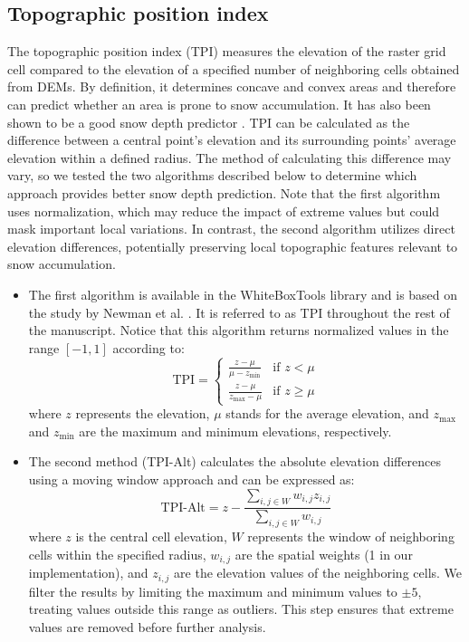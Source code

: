 \documentclass[preprint,12pt]{elsarticle}
\begin{document}
\subsection{Topographic position index} \label{sec_tpi}

The topographic position index (TPI) measures the elevation of the raster grid cell compared to the elevation of a specified number of neighboring cells obtained from DEMs. By definition, it determines concave and convex areas and therefore can predict whether an area is prone to snow accumulation. It has also been shown to be a good snow depth predictor \cite{revuelto2020random, daudt2023snow}. TPI can be calculated as the difference between a central point's elevation and its surrounding points' average elevation within a defined radius. The method of calculating this difference may vary, so we tested the two algorithms described below to determine which approach provides better snow depth prediction. Note that the first algorithm uses normalization, which may reduce the impact of extreme values but could mask important local variations. In contrast, the second algorithm utilizes direct elevation differences, potentially preserving local topographic features relevant to snow accumulation.

\begin{itemize}
    \item The first algorithm is available in the WhiteBoxTools library \cite{lindsay2014whitebox} and is based on the study by Newman et al. \cite{newman2018evaluating}. It is referred to as TPI throughout the rest of the manuscript. Notice that this algorithm returns normalized values in the range $[-1, 1]$ according to:
    \begin{equation}
        \text{TPI} =
        \begin{cases}
            \frac{z - \mu}{\mu - z_{\text{min}}} & \text{if } z < \mu \\ 
            \frac{z - \mu}{z_{\text{max}} - \mu} & \text{if } z \geq \mu
        \end{cases}
    \end{equation}
    \noindent where $z$ represents the elevation, $\mu$ stands for the average elevation, and $z_{\text{max}}$ and $z_{\text{min}}$ are the maximum and minimum elevations, respectively.
    
    \item The second method (TPI-Alt) calculates the absolute elevation differences using a moving window approach and can be expressed as:
    \begin{equation}
            \text{TPI-Alt} = z - \frac{\sum_{i,j \in W} w_{i,j}z_{i,j}}{\sum_{i,j \in W} w_{i,j}}
    \end{equation}
    \noindent where $z$ is the central cell elevation, $W$ represents the window of neighboring cells within the specified radius, $w_{i,j}$ are the spatial weights (1 in our implementation), and $z_{i,j}$ are the elevation values of the neighboring cells. We filter the results by limiting the maximum and minimum values to $\pm5$, treating values outside this range as outliers. This step ensures that extreme values are removed before further analysis.
\end{itemize}
\end{document}
